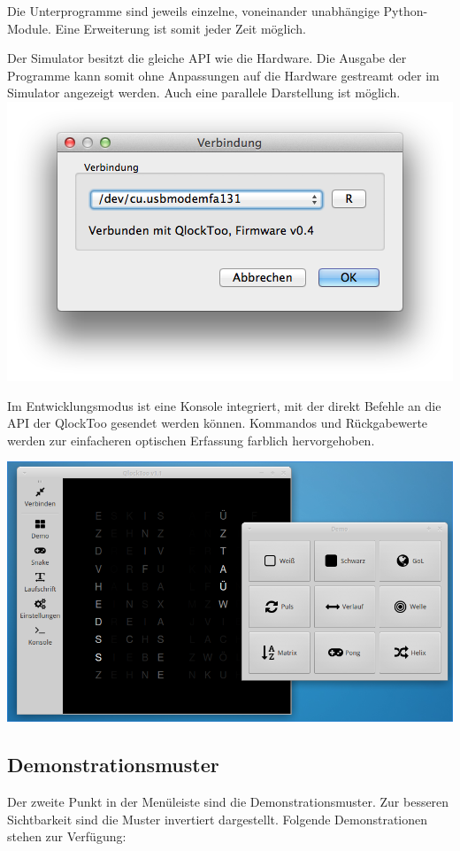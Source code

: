 \begin{multicols}{2}
Die Unterprogramme sind jeweils einzelne, voneinander unabhängige Python-Module. Eine Erweiterung ist somit jeder Zeit möglich. 

Der Simulator besitzt die gleiche API wie die Hardware. Die Ausgabe der Programme kann somit ohne Anpassungen auf die Hardware gestreamt oder im Simulator angezeigt werden. Auch eine parallele Darstellung ist möglich.
\includegraphics[width=\columnwidth]{Abbildungen/Software/ConnectDialog}

Im Entwicklungsmodus ist eine Konsole integriert, mit der direkt Befehle an die API der QlockToo gesendet werden können. Kommandos und Rückgabewerte werden zur einfacheren optischen Erfassung farblich hervorgehoben.

{
\centering\includegraphics[width=0.85\columnwidth]{Abbildungen/Software/Linux}

}


\subsection{Demonstrationsmuster}
Der zweite Punkt in der Menüleiste sind die Demonstrationsmuster. Zur besseren Sichtbarkeit sind die Muster invertiert dargestellt. Folgende Demonstrationen stehen zur Verfügung:


\end{multicols}
